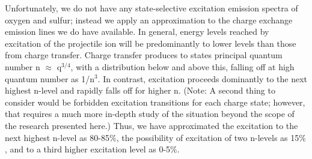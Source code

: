 \documentclass[draft]{agujournal2018}
\begin{document}
Unfortunately, we do not have any state-selective excitation emission spectra of oxygen and sulfur; instead we apply an approximation to the charge exchange emission lines we do have available.
In general, energy levels reached by excitation of the projectile ion will be predominantly to lower levels than those from charge transfer.
Charge transfer produces to states principal quantum number n $\approx$ q$^{3/4}$, with a distribution below and above this, falling off at high quantum number as 1/n$^3$.
In contrast, excitation proceeds dominantly to the next highest n-level and rapidly falls off for higher n.
(Note: A second thing to consider would be forbidden excitation transitions for each charge state; however, that requires a much more in-depth study of the situation beyond the scope of the research presented here.)
Thus, we have approximated the excitation to the next highest n-level as 80-85$\%$, the possibility of excitation of two n-levels as 15$\%$, and to a third higher excitation level as 0-5$\%$.

\end{document}
